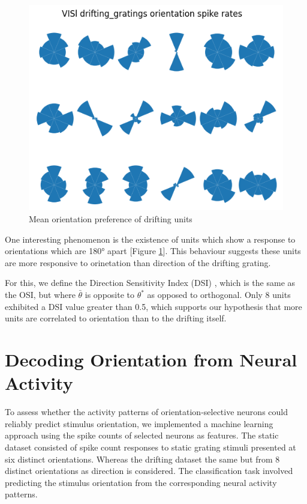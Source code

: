 \documentclass[10pt,twocolumn]{article}
\begin{document}
\begin{figure}[h]
  \centering
  \includegraphics[width=0.6\linewidth]{report_images/drifting_unit_mean_orientation.png}
  \caption{Mean orientation preference of drifting units}
  \label{fig:drifting_unit_mean_orientation}
\end{figure}

One interesting phenomenon is the existence of units which show a response to orientations which are 180° apart [Figure \ref{fig:drifting_unit_mean_orientation}].  This behaviour suggests these units are more responsive to orinetation than direction of the drifting grating.

For this, we define the Direction Sensitivity Index (DSI) \cite{niell2008highly}, which is the same as the OSI, but where \(\bar\theta\) is opposite to \(\theta^*\) as opposed to orthogonal.  Only 8 units exhibited a DSI value greater than 0.5, which supports our hypothesis that more units are correlated to orientation than to the drifting itself.

\section{Decoding Orientation from Neural Activity}

To assess whether the activity patterns of orientation-selective neurons could reliably predict stimulus orientation, we implemented a machine learning approach using the spike counts of selected neurons as features. The static dataset consisted of spike count responses to static grating stimuli presented at six distinct orientations. Whereas the drifting dataset the same but from 8 distinct orientations as direction is considered. The classification task involved predicting the stimulus orientation from the corresponding neural activity patterns.
\end{document}
